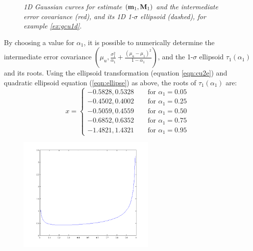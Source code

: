\begin{example}
\begin{figure}[tbp]
    \caption{\it 1D Gaussian curves for estimate $(\mathbf{m}_1,\mathbf{M}_1)$ and the intermediate error covariance (red), and
            its 1D 1-$\sigma$ ellipsoid (dashed), for example \ref{ex:gcu1d}.}
    \label{fig:alpha1d}
\end{figure}
By choosing a value for $\alpha_1$, it is possible to numerically determine the intermediate error covariance
$\left(\mu_u,\frac{\sigma_1^2}{\alpha_1}+\frac{(\mu_u-\mu_1)^2}{1-\alpha_1}\right)$, and the 1-$\sigma$ ellipsoid
$\tau_1(\alpha_1)$ and its roots. Using the ellipsoid transformation (equation \ref{eqn:cu2e}) and quadratic ellipsoid
equation (\ref{eqn:ellipse}) as above, the roots of $\tau_1(\alpha_1)$ are:
\begin{equation}
    x = \begin{cases}
            -0.5828, 0.5328 \qquad \text{for $\alpha_1 = 0.05$}\\
            -0.4502, 0.4002 \qquad \text{for $\alpha_1 = 0.25$}\\
            -0.5059, 0.4559 \qquad \text{for $\alpha_1 = 0.50$}\\
            -0.6852, 0.6352 \qquad \text{for $\alpha_1 = 0.75$}\\
            -1.4821, 1.4321 \qquad \text{for $\alpha_1 = 0.95$}
        \end{cases}
\end{equation}
\begin{figure}[tbp]
    \centering\includegraphics[width=0.6\textwidth]{figures/alpha1dcurve.png}

\end{figure}
\end{example}
